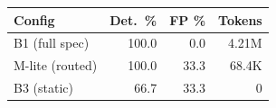 \begin{tabular}{lrrr}
\toprule
Config & Det.\ \% & FP \% & Tokens \\
\midrule
B1 (full spec) & 100.0 & 0.0 & 4.21M \\
M-lite (routed) & 100.0 & 33.3 & 68.4K \\
B3 (static) & 66.7 & 33.3 & 0 \\
\bottomrule
\end{tabular}

